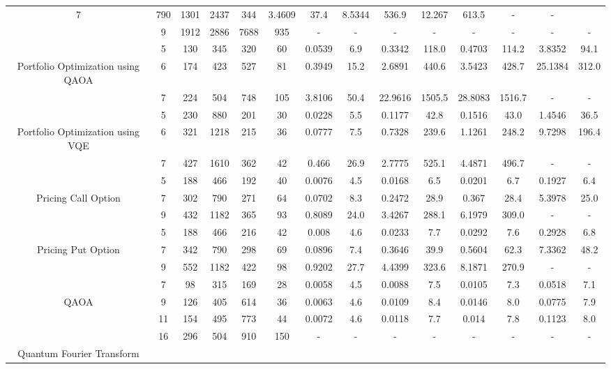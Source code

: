\begin{table}[htb]
{\begin{tabular}{|c|c|c|c|c|c|c|c|c|c|c|c|c|c|}
7 & 790 & 1301 & 2437 & 344
 & 3.4609 & 37.4
 & 8.5344 & 536.9
 & 12.267 & 613.5
 & - & -
 \\
 & 
9 & 1912 & 2886 & 7688 & 935
 & - & -
 & - & -
 & - & -
 & - & -
 \\
\hline
 & 
5 & 130 & 345 & 320 & 60
 & 0.0539 & 6.9
 & 0.3342 & 118.0
 & 0.4703 & 114.2
 & 3.8352 & 94.1
 \\
Portfolio Optimization using QAOA & 
6 & 174 & 423 & 527 & 81
 & 0.3949 & 15.2
 & 2.6891 & 440.6
 & 3.5423 & 428.7
 & 25.1384 & 312.0
 \\
 & 
7 & 224 & 504 & 748 & 105
 & 3.8106 & 50.4
 & 22.9616 & 1505.5
 & 28.8083 & 1516.7
 & - & -
 \\
\hline
 & 
5 & 230 & 880 & 201 & 30
 & 0.0228 & 5.5
 & 0.1177 & 42.8
 & 0.1516 & 43.0
 & 1.4546 & 36.5
 \\
Portfolio Optimization using VQE & 
6 & 321 & 1218 & 215 & 36
 & 0.0777 & 7.5
 & 0.7328 & 239.6
 & 1.1261 & 248.2
 & 9.7298 & 196.4
 \\
 & 
7 & 427 & 1610 & 362 & 42
 & 0.466 & 26.9
 & 2.7775 & 525.1
 & 4.4871 & 496.7
 & - & -
 \\
\hline
 & 
5 & 188 & 466 & 192 & 40
 & 0.0076 & 4.5
 & 0.0168 & 6.5
 & 0.0201 & 6.7
 & 0.1927 & 6.4
 \\
Pricing Call Option & 
7 & 302 & 790 & 271 & 64
 & 0.0702 & 8.3
 & 0.2472 & 28.9
 & 0.367 & 28.4
 & 5.3978 & 25.0
 \\
 & 
9 & 432 & 1182 & 365 & 93
 & 0.8089 & 24.0
 & 3.4267 & 288.1
 & 6.1979 & 309.0
 & - & -
 \\
\hline
 & 
5 & 188 & 466 & 216 & 42
 & 0.008 & 4.6
 & 0.0233 & 7.7
 & 0.0292 & 7.6
 & 0.2928 & 6.8
 \\
Pricing Put Option & 
7 & 342 & 790 & 298 & 69
 & 0.0896 & 7.4
 & 0.3646 & 39.9
 & 0.5604 & 62.3
 & 7.3362 & 48.2
 \\
 & 
9 & 552 & 1182 & 422 & 98
 & 0.9202 & 27.7
 & 4.4399 & 323.6
 & 8.1871 & 270.9
 & - & -
 \\
\hline
 & 
7 & 98 & 315 & 169 & 28
 & 0.0058 & 4.5
 & 0.0088 & 7.5
 & 0.0105 & 7.3
 & 0.0518 & 7.1
 \\
QAOA & 
9 & 126 & 405 & 614 & 36
 & 0.0063 & 4.6
 & 0.0109 & 8.4
 & 0.0146 & 8.0
 & 0.0775 & 7.9
 \\
 & 
11 & 154 & 495 & 773 & 44
 & 0.0072 & 4.6
 & 0.0118 & 7.7
 & 0.014 & 7.8
 & 0.1123 & 8.0
 \\
\hline
 & 
16 & 296 & 504 & 910 & 150
 & - & -
 & - & -
 & - & -
 & - & -
 \\
Quantum Fourier Transform & 

\end{tabular}}
\end{table}
